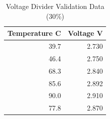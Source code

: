 \begin{table}[H]
\centering
\caption{Voltage Divider Validation Data (30\%)}
\label{table:voltage_divider_validation_table}
\begin{tabular}{rr}
\toprule
 Temperature C & Voltage V \\
\midrule
 39.7 & 2.730 \\
 46.4 & 2.750 \\
 68.3 & 2.840 \\
 85.6 & 2.892 \\
 90.0 & 2.910 \\
 77.8 & 2.870 \\
\bottomrule
\end{tabular}
\end{table}
